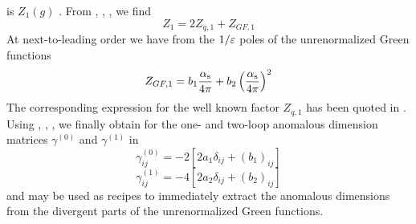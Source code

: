 is $Z_1(g)$ . From , , , 
we find
\begin{equation}\label{zqgf}
Z_1=2Z_{q,1}+Z_{GF,1}  \end{equation}
At next-to-leading order we have from the $1/\varepsilon$ poles of the
unrenormalized Green functions
\begin{equation}\label{zgf1}
Z_{GF,1}=b_1 \frac{\alpha_{\rm s}}{4 \pi} + b_2 \left(\frac{\alpha_{\rm s}}{4 \pi}\right)^2  \end{equation}
The corresponding expression for the well known factor $Z_{q,1}$
has been quoted in . Using , ,
,  we finally obtain for the one- and two-loop
anomalous dimension matrices $\gamma^{(0)}$ and $\gamma^{(1)}$ in
\begin{equation}\label{a1b1}
\gamma^{(0)}_{ij}=-2[2a_1 \delta_{ij}+(b_1)_{ij}]  \end{equation}
\begin{equation}\label{a2b2}
\gamma^{(1)}_{ij}=-4[2a_2 \delta_{ij}+(b_2)_{ij}]  \end{equation}
 and  may be used as recipes to immediately extract
the anomalous dimensions from the divergent parts of the
unrenormalized Green functions.


